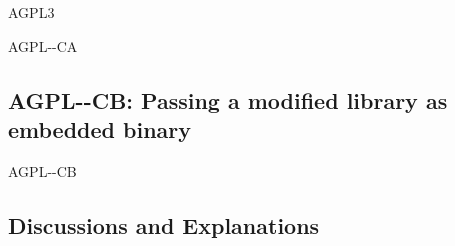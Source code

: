 \begin{license}{AGPL3}
\begin{lsuc}{AGPL-\ver-CA}
  \begin{lsucprohibits}
    \lsucitem{\noPatentLitigation}
  \end{lsucprohibits}
\end{lsuc}

\subsection{AGPL-\ver-CB: Passing a modified library as embedded binary}
\begin{lsuc}{AGPL-\ver-CB}

  \useCaseB

  \begin{lsucrequires}
    \lsucmandatory{\keepLicenseElements}
    \lsucmandatory{\gplthreeEnsureCopyrightNoticeBinary}
    \lsucmandatory{\giveLicense}\passingFilesCorrectly
    \lsucmandatory{\retainCopyrightNotices}
    \lsucmandatory{\makeAllSourcesAvailable}
    \lsucmandatory{\describeHowToGetSource}
    \lsucmandatory{\addToCopyrightDialogLib}
    \lsucmandatory{\markEmbeddedModifications}
    \lsucmandatory{\arrangeEmbeddedChanges}\howToApplyTheseTerms
    \lsucmandatory{\arrangeEnclosingBinaries}
    \lsucoptional{\createChangelog}
    \lsucoptional{\addToDocumentation}
  \end{lsucrequires}

  \begin{lsucprohibits}
    \lsucitem{\noPatentLitigation}
  \end{lsucprohibits}
\end{lsuc}

\end{license}


\subsection{Discussions and Explanations}
\label{AGPL3Discussion}
  


